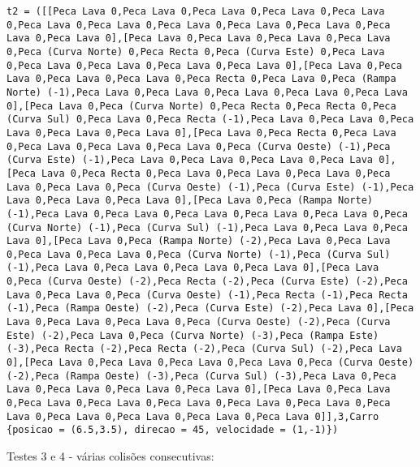 \documentclass[a4paper]{report}
\begin{document}
\begin{lstlisting}
t2 = ([[Peca Lava 0,Peca Lava 0,Peca Lava 0,Peca Lava 0,Peca Lava 0,Peca Lava 0,Peca Lava 0,Peca Lava 0,Peca Lava 0,Peca Lava 0,Peca Lava 0,Peca Lava 0],[Peca Lava 0,Peca Lava 0,Peca Lava 0,Peca Lava 0,Peca (Curva Norte) 0,Peca Recta 0,Peca (Curva Este) 0,Peca Lava 0,Peca Lava 0,Peca Lava 0,Peca Lava 0,Peca Lava 0],[Peca Lava 0,Peca Lava 0,Peca Lava 0,Peca Lava 0,Peca Recta 0,Peca Lava 0,Peca (Rampa Norte) (-1),Peca Lava 0,Peca Lava 0,Peca Lava 0,Peca Lava 0,Peca Lava 0],[Peca Lava 0,Peca (Curva Norte) 0,Peca Recta 0,Peca Recta 0,Peca (Curva Sul) 0,Peca Lava 0,Peca Recta (-1),Peca Lava 0,Peca Lava 0,Peca Lava 0,Peca Lava 0,Peca Lava 0],[Peca Lava 0,Peca Recta 0,Peca Lava 0,Peca Lava 0,Peca Lava 0,Peca Lava 0,Peca (Curva Oeste) (-1),Peca (Curva Este) (-1),Peca Lava 0,Peca Lava 0,Peca Lava 0,Peca Lava 0],[Peca Lava 0,Peca Recta 0,Peca Lava 0,Peca Lava 0,Peca Lava 0,Peca Lava 0,Peca Lava 0,Peca (Curva Oeste) (-1),Peca (Curva Este) (-1),Peca Lava 0,Peca Lava 0,Peca Lava 0],[Peca Lava 0,Peca (Rampa Norte) (-1),Peca Lava 0,Peca Lava 0,Peca Lava 0,Peca Lava 0,Peca Lava 0,Peca (Curva Norte) (-1),Peca (Curva Sul) (-1),Peca Lava 0,Peca Lava 0,Peca Lava 0],[Peca Lava 0,Peca (Rampa Norte) (-2),Peca Lava 0,Peca Lava 0,Peca Lava 0,Peca Lava 0,Peca (Curva Norte) (-1),Peca (Curva Sul) (-1),Peca Lava 0,Peca Lava 0,Peca Lava 0,Peca Lava 0],[Peca Lava 0,Peca (Curva Oeste) (-2),Peca Recta (-2),Peca (Curva Este) (-2),Peca Lava 0,Peca Lava 0,Peca (Curva Oeste) (-1),Peca Recta (-1),Peca Recta (-1),Peca (Rampa Oeste) (-2),Peca (Curva Este) (-2),Peca Lava 0],[Peca Lava 0,Peca Lava 0,Peca Lava 0,Peca (Curva Oeste) (-2),Peca (Curva Este) (-2),Peca Lava 0,Peca (Curva Norte) (-3),Peca (Rampa Este) (-3),Peca Recta (-2),Peca Recta (-2),Peca (Curva Sul) (-2),Peca Lava 0],[Peca Lava 0,Peca Lava 0,Peca Lava 0,Peca Lava 0,Peca (Curva Oeste) (-2),Peca (Rampa Oeste) (-3),Peca (Curva Sul) (-3),Peca Lava 0,Peca Lava 0,Peca Lava 0,Peca Lava 0,Peca Lava 0],[Peca Lava 0,Peca Lava 0,Peca Lava 0,Peca Lava 0,Peca Lava 0,Peca Lava 0,Peca Lava 0,Peca Lava 0,Peca Lava 0,Peca Lava 0,Peca Lava 0,Peca Lava 0]],3,Carro {posicao = (6.5,3.5), direcao = 45, velocidade = (1,-1)})
\end{lstlisting}

Testes 3 e 4 - várias colisões consecutivas:
\end{document}
